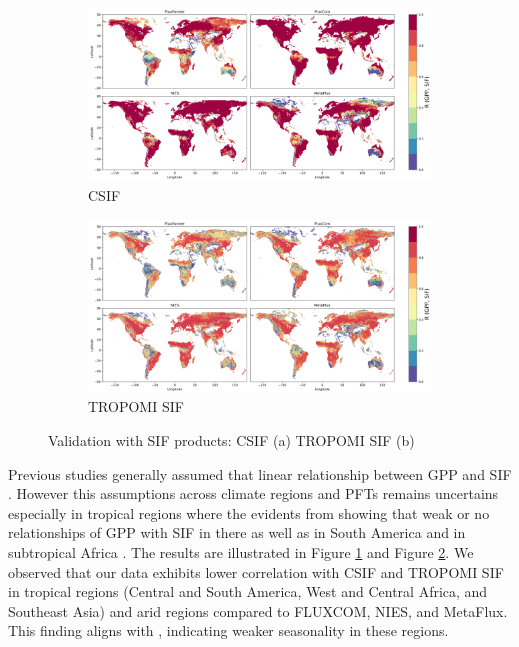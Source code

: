 \begin{figure}[tbh!]
    \centering
    \begin{subfigure}{\textwidth}
      \centering
      \includegraphics[width=\textwidth]{figs/chap6/val_CSIF.png}
      \caption{CSIF}
      \label{fig:chap6_fig5a}
    \end{subfigure}

    \begin{subfigure}{\textwidth}
      \centering
      \includegraphics[width=\textwidth]{figs/chap6/val_TROPOMI_SIF.png}
      \caption{TROPOMI SIF}
      \label{fig:chap6_fig5b}
    \end{subfigure}
    \caption[Validation with SIF products]{Validation with SIF products: CSIF (a) TROPOMI SIF (b)}
    \label{fig:chap6_fig5}
\end{figure}

Previous studies generally assumed that linear relationship between GPP and SIF \citep{guanter2012retrieval, yang2017chlorophyll}. However this assumptions across climate regions and PFTs remains uncertains \citep{gu2019sun, xiao2019solar, zhang2016model, chen2021seasonal} especially in tropical regions where the evidents from showing that weak or no relationships of GPP with SIF in there as well as in South America and in subtropical Africa \citep{doughty2021global}.
The results are illustrated in Figure \ref{fig:chap6_fig5a} and Figure \ref{fig:chap6_fig5b}. We observed that our data exhibits lower correlation with CSIF and TROPOMI SIF in tropical regions (Central and South America, West and Central Africa, and Southeast Asia) and arid regions compared to FLUXCOM, NIES, and MetaFlux. This finding aligns with \citep{sanders2016spaceborne}, indicating weaker seasonality in these regions.\par


